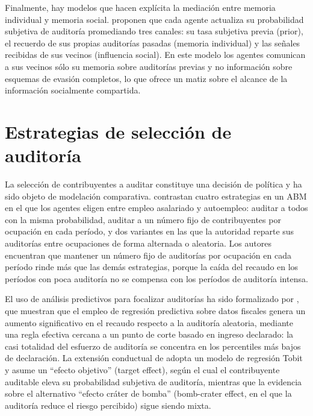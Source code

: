 Finalmente, hay modelos que hacen explícita la mediación entre memoria individual y memoria social. \textcite{garcia2019network} proponen que cada agente actualiza su probabilidad subjetiva de auditoría promediando tres canales: su tasa subjetiva previa (prior), el recuerdo de sus propias auditorías pasadas (memoria individual) y las señales recibidas de sus vecinos (influencia social). En este modelo los agentes comunican a sus vecinos sólo su memoria sobre auditorías previas y no información sobre esquemas de evasión completos, lo que ofrece un matiz sobre el alcance de la información socialmente compartida.

\section{Estrategias de selección de auditoría}
\label{sec:edo-estrategias}

La selección de contribuyentes a auditar constituye una decisión de política y ha sido objeto de modelación comparativa. \textcite{hashimzade2014agent} contrastan cuatro estrategias en un ABM en el que los agentes eligen entre empleo asalariado y autoempleo: auditar a todos con la misma probabilidad, auditar a un número fijo de contribuyentes por ocupación en cada período, y dos variantes en las que la autoridad reparte sus auditorías entre ocupaciones de forma alternada o aleatoria. Los autores encuentran que mantener un número fijo de auditorías por ocupación en cada período rinde más que las demás estrategias, porque la caída del recaudo en los períodos con poca auditoría no se compensa con los períodos de auditoría intensa.

El uso de análisis predictivos para focalizar auditorías ha sido formalizado por \textcite{hashimzade2016predictive}, que muestran que el empleo de regresión predictiva sobre datos fiscales genera un aumento significativo en el recaudo respecto a la auditoría aleatoria, mediante una regla efectiva cercana a un punto de corte basado en ingreso declarado: la casi totalidad del esfuerzo de auditoría se concentra en los percentiles más bajos de declaración. La extensión conductual de \textcite{hashimzade2016risk} adopta un modelo de regresión Tobit y asume un ``efecto objetivo'' (target effect), según el cual el contribuyente auditable eleva su probabilidad subjetiva de auditoría, mientras que la evidencia sobre el alternativo ``efecto cráter de bomba'' (bomb-crater effect, en el que la auditoría reduce el riesgo percibido) sigue siendo mixta.

